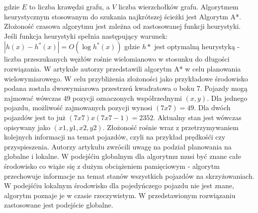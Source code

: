 \newline
gdzie \begin{math}E\end{math} to liczba krawędzi grafu, a \begin{math}V\end{math} liczba wierzchołków grafu.
\indent
\newline
\newline
\indent
  Algorytmem heurystycznym stosowanym do szukania najkrótszej ścieżki jest Algorytm A*. Złożoność czasowa algorytmu jest zależna od zastosowanej funkcji heurystyki. Jeśli funkcja heurystyki spełnia następujący warunek:
\newline
\newline
\begin{math}
|h(x)-h^{*}(x)|=O(\log h^{*}(x))
\end{math}
\newline
\newline
gdzie \begin{math}h*\end{math} jest optymalną heurystyką - liczba przeszukanych węzłów rośnie wielomianowo w stosunku do długości rozwiązania.
\newline
\newline
\indent
W artykule \cite{wojnicki2015robust} autorzy przedstawili algorytm A* w celu planowania wielowymiarowego. W celu przybliżenia złożoności jako przykładowe środowisko podana została dwuwymiarowa przestrzeń kwadratowa o boku 7. Pojazdy mogą zajmować wówczas 49 pozycji oznaczonych współrzednymi \begin{math}(x, y)\end{math}. Dla jednego pojazdu, możliwość zajmowanych pozycji wynosi \begin{math}(7 x 7) = 49 \end{math}. Dla dwóch pojazdów jest to już \begin{math}(7 x 7) x (7 x 7 - 1) = 2352 \end{math}. Aktualny stan jest wówczas opisywany jako \begin{math}(x1, y1, x2, y2)\end{math}. Złożoność rośnie wraz z przetrzymywaniem kolejnych informacji na temat pojazdów, czyli  na przykład prędkośći czy przyspieszenia.
\indent
\newline
Autorzy artykułu \cite{leena2014survey} zwrócili uwagę na podział planowania na globalne i lokalne. W podejśćiu globalnym dla algorytmu musi być znane całe środowisko co wiąże się z dużym obciążeniem pamięciowym - algorytm przechowuje informacje na temat stanów wszystkich pojazdów na skrzyżowaniach. W podejśćiu lokalnym środowisko dla pojedyńczego pojazdu nie jest znane, algorytm poznaje je w czasie rzeczywistym. W przedstawionym rozwiązaniu zastosowane jest podejście globalne.

